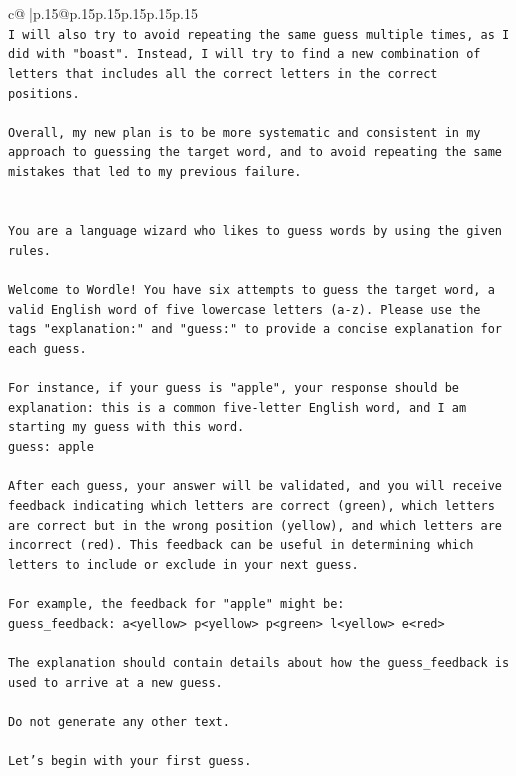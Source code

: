 \documentclass{article}
\begin{document}
{\begin{supertabular}{c@{$\;$}|p{.15\linewidth}@{}p{.15\linewidth}p{.15\linewidth}p{.15\linewidth}p{.15\linewidth}p{.15\linewidth}}
{{{\\ 
\texttt{I will also try to avoid repeating the same guess multiple times, as I did with "boast". Instead, I will try to find a new combination of letters that includes all the correct letters in the correct positions. } \\
\\ 
\texttt{Overall, my new plan is to be more systematic and consistent in my approach to guessing the target word, and to avoid repeating the same mistakes that led to my previous failure.} \\
\\ 
\\ 
\texttt{You are a language wizard who likes to guess words by using the given rules.} \\
\\ 
\texttt{Welcome to Wordle! You have six attempts to guess the target word, a valid English word of five lowercase letters (a{-}z). Please use the tags "explanation:" and "guess:" to provide a concise explanation for each guess.} \\
\\ 
\texttt{For instance, if your guess is "apple", your response should be} \\
\texttt{explanation: this is a common five{-}letter English word, and I am starting my guess with this word.} \\
\texttt{guess: apple} \\
\\ 
\texttt{After each guess, your answer will be validated, and you will receive feedback indicating which letters are correct (green), which letters are correct but in the wrong position (yellow), and which letters are incorrect (red). This feedback can be useful in determining which letters to include or exclude in your next guess.} \\
\\ 
\texttt{For example, the feedback for "apple" might be:} \\
\texttt{guess\_feedback: a<yellow> p<yellow> p<green> l<yellow> e<red>} \\
\\ 
\texttt{The explanation should contain details about how the guess\_feedback is used to arrive at a new guess.} \\
\\ 
\texttt{Do not generate any other text.} \\
\\ 
\texttt{Let's begin with your first guess.} \\
            }
        }
    }
     \\ \\


\end{supertabular}}
\end{document}
